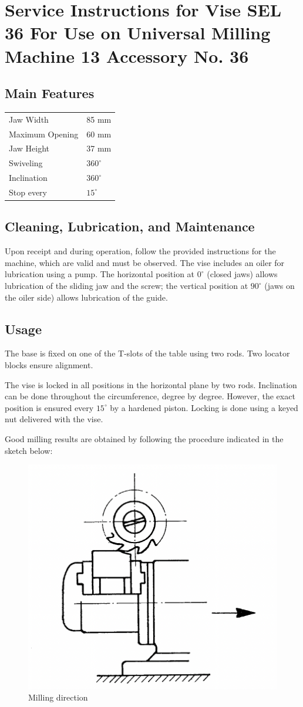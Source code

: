 \chapter{Service Instructions for Vise SEL 36 For Use on Universal Milling Machine 13 \small{Accessory No. 36}}

\section*{Main Features}

\begin{tabular}{@{}ll@{}}
    Jaw Width       & 85 mm         \\
    Maximum Opening & 60 mm         \\
    Jaw Height      & 37 mm         \\
    Swiveling       & \(360^\circ\) \\
    Inclination     & \(360^\circ\) \\
    Stop every      & \(15^\circ\)  \\
\end{tabular}

\section*{Cleaning, Lubrication, and Maintenance}

Upon receipt and during operation, follow the provided instructions for the machine, which are valid and must be observed.
The vise includes an oiler for lubrication using a pump.
The horizontal position at \(0^\circ\) (closed jaws) allows lubrication of the sliding jaw and the screw; the vertical position at \(90^\circ\) (jaws on the oiler side) allows lubrication of the guide.

\section*{Usage}

The base is fixed on one of the T-slots of the table using two rods. Two locator blocks ensure alignment.

The vise is locked in all positions in the horizontal plane by two rods.
Inclination can be done throughout the circumference, degree by degree.
However, the exact position is ensured every \(15^\circ\) by a hardened piston.
Locking is done using a keyed nut delivered with the vise.

Good milling results are obtained by following the procedure indicated in the sketch below:

\begin{figure}[h]
    \centering
    \includegraphics[width=0.5\linewidth]{images/page_43}
    \caption{Milling direction}
    \label{fig:milling_direction}
\end{figure}

